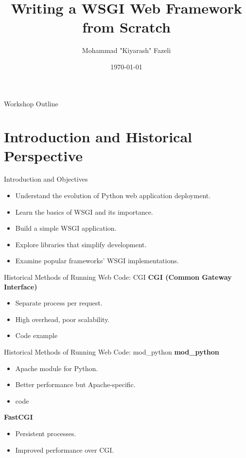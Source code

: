 \documentclass{beamer}
\title[Writing a WSGI Web Framework]{Writing a WSGI Web Framework from Scratch}
\author{Mohammad "Kiyarash" Fazeli}
\institute{Maktabkhooneh.org}
\date{\today}
\begin{document}
\begin{frame}
    \titlepage
\end{frame}

\begin{frame}{Workshop Outline}
    \tableofcontents
\end{frame}

\section{Introduction and Historical Perspective}

\begin{frame}{Introduction and Objectives}
    \begin{itemize}[<+->]
        \item Understand the evolution of Python web application deployment.
        \item Learn the basics of WSGI and its importance.
        \item Build a simple WSGI application.
        \item Explore libraries that simplify development.
        \item Examine popular frameworks' WSGI implementations.
    \end{itemize}
\end{frame}

\begin{frame}{Historical Methods of Running Web Code: CGI}
	\textbf{CGI (Common Gateway Interface)}
            \begin{itemize}[<+->]
                \item Separate process per request.
                \item High overhead, poor scalability.
               	\item Code example
            \end{itemize}
\end{frame}

\begin{frame}{Historical Methods of Running Web Code: mod\_python}
	\textbf{mod\_python}
		\begin{itemize}[<+->]
			\item Apache module for Python.
			\item Better performance but Apache-specific.
			\item code
		\end{itemize}
		\textbf{FastCGI}
		\begin{itemize}
			\item Persistent processes.
			\item Improved performance over CGI.
		\end{itemize}
\end{frame}
\end{document}
